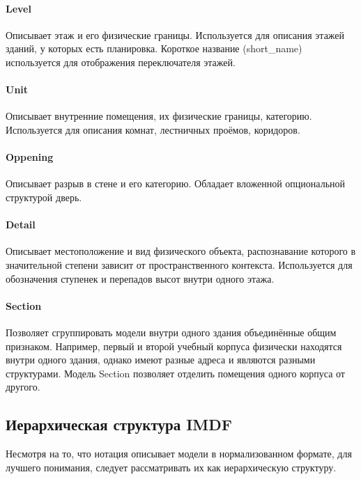         \paragraph{Level}
          Описывает этаж и его физические границы. Используется для описания этажей зданий, у которых есть планировка. Короткое название (short\_name) используется для отображения переключателя этажей.

        \paragraph{Unit}
          Описывает внутренние помещения, их физические границы, категорию. Используется для описания комнат, лестничных проёмов, коридоров.

        \paragraph{Oppening}
          Описывает разрыв в стене и его категорию. Обладает вложенной опциональной структурой дверь.

        \paragraph{Detail}
          Описывает местоположение и вид физического объекта, распознавание которого в значительной степени зависит от пространственного контекста. Используется для обозначения ступенек и перепадов высот внутри одного этажа.

        \paragraph{Section}
          Позволяет сгруппировать модели внутри одного здания объединённые общим признаком. Например, первый и второй учебный корпуса физически находятся внутри одного здания, однако имеют разные адреса и являются разными структурами. Модель Section позволяет отделить помещения одного корпуса от другого.

    \subsection{Иерархическая структура IMDF}
      Несмотря на то, что нотация описывает модели в нормализованном формате, для лучшего понимания, следует рассматривать их как иерархическую структуру.


